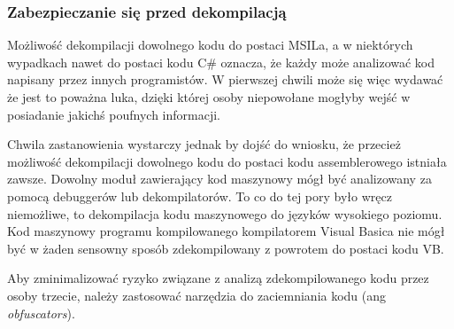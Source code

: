 \subsubsection{Zabezpieczanie się przed dekompilacją}

Możliwość dekompilacji dowolnego kodu do postaci MSILa, a w niektórych wypadkach nawet do postaci kodu C\# 
oznacza, że każdy może analizować kod napisany przez innych programistów. W pierwszej chwili może się więc
wydawać że jest to poważna luka, dzięki której osoby niepowołane mogłyby wejść w posiadanie jakichś
poufnych informacji.

Chwila zastanowienia wystarczy jednak by dojść do wniosku, że przecież możliwość dekompilacji dowolnego kodu
do postaci kodu assemblerowego istniała zawsze. Dowolny moduł zawierający kod maszynowy mógł być analizowany
za pomocą debuggerów lub dekompilatorów. To co do tej pory było wręcz niemożliwe, to dekompilacja 
kodu maszynowego do języków wysokiego poziomu. Kod maszynowy programu kompilowanego kompilatorem Visual Basica
nie mógł być w żaden sensowny sposób zdekompilowany z powrotem do postaci kodu VB.

Aby zminimalizować ryzyko związane z analizą zdekompilowanego kodu przez osoby trzecie, należy zastosować
narzędzia do zaciemniania kodu (ang {\em obfuscators}). 

